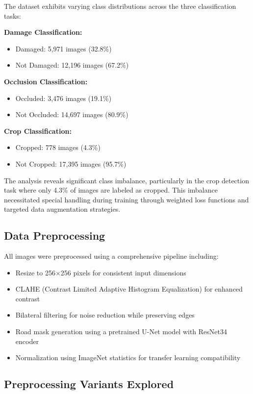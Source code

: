 \documentclass[12pt,twocolumn]{article}
\begin{document}
The dataset exhibits varying class distributions across the three classification tasks:

\textbf{Damage Classification:}
\begin{itemize}
\item Damaged: 5,971 images (32.8\%)
\item Not Damaged: 12,196 images (67.2\%)
\end{itemize}

\textbf{Occlusion Classification:}
\begin{itemize}
\item Occluded: 3,476 images (19.1\%)
\item Not Occluded: 14,697 images (80.9\%)
\end{itemize}

\textbf{Crop Classification:}
\begin{itemize}
\item Cropped: 778 images (4.3\%)
\item Not Cropped: 17,395 images (95.7\%)
\end{itemize}

The analysis reveals significant class imbalance, particularly in the crop detection task where only 4.3\% of images are labeled as cropped. This imbalance necessitated special handling during training through weighted loss functions and targeted data augmentation strategies.

\subsection{Data Preprocessing}

All images were preprocessed using a comprehensive pipeline including:
\begin{itemize}
\item Resize to 256×256 pixels for consistent input dimensions
\item CLAHE (Contrast Limited Adaptive Histogram Equalization) for enhanced contrast
\item Bilateral filtering for noise reduction while preserving edges
\item Road mask generation using a pretrained U-Net model with ResNet34 encoder
\item Normalization using ImageNet statistics for transfer learning compatibility
\end{itemize}

\subsection{Preprocessing Variants Explored}
\end{document}
